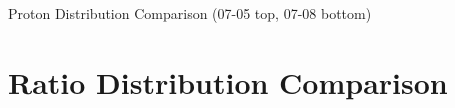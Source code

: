 \documentclass{beamer}
\begin{document}
\begin{frame}{Proton Distribution Comparison (07-05 top, 07-08 bottom)}

\begin{center}
\end{center}
\begin{center}
\end{center}

\end{frame}


\section{Ratio Distribution Comparison}
\end{document}
